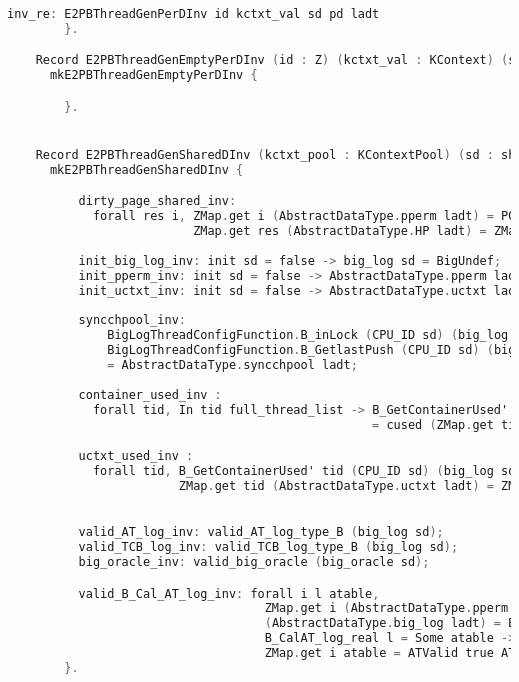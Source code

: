 \begin{lstlisting}[language=C]
          inv_re: E2PBThreadGenPerDInv id kctxt_val sd pd ladt
        }.

    Record E2PBThreadGenEmptyPerDInv (id : Z) (kctxt_val : KContext) (sd : sharedData) (ladt : AbstractDataType.RData) :=
      mkE2PBThreadGenEmptyPerDInv {

        }.


    Record E2PBThreadGenSharedDInv (kctxt_pool : KContextPool) (sd : sharedData) (ladt : AbstractDataType.RData) :=
      mkE2PBThreadGenSharedDInv {

          dirty_page_shared_inv:
            forall res i, ZMap.get i (AbstractDataType.pperm ladt) = PGUndef ->
                          ZMap.get res (AbstractDataType.HP ladt) = ZMap.get res (FlatMem.free_page i (AbstractDataType.HP ladt));
          
          init_big_log_inv: init sd = false -> big_log sd = BigUndef;
          init_pperm_inv: init sd = false -> AbstractDataType.pperm ladt = ZMap.init PGUndef;
          init_uctxt_inv: init sd = false -> AbstractDataType.uctxt ladt = ZMap.init (ZMap.init Vundef);
         
          syncchpool_inv:  
              BigLogThreadConfigFunction.B_inLock (CPU_ID sd) (big_log sd) = false ->
              BigLogThreadConfigFunction.B_GetlastPush (CPU_ID sd) (big_log sd) 
              = AbstractDataType.syncchpool ladt;
          
          container_used_inv :
            forall tid, In tid full_thread_list -> B_GetContainerUsed' tid (CPU_ID sd) (big_log sd) 
                                                   = cused (ZMap.get tid (AbstractDataType.AC ladt));

          uctxt_used_inv :
            forall tid, B_GetContainerUsed' tid (CPU_ID sd) (big_log sd) = false ->
                        ZMap.get tid (AbstractDataType.uctxt ladt) = ZMap.init Vundef;

          
          valid_AT_log_inv: valid_AT_log_type_B (big_log sd); 
          valid_TCB_log_inv: valid_TCB_log_type_B (big_log sd);
          big_oracle_inv: valid_big_oracle (big_oracle sd);

          valid_B_Cal_AT_log_inv: forall i l atable, 
                                    ZMap.get i (AbstractDataType.pperm ladt) <> PGUndef ->
                                    (AbstractDataType.big_log ladt) = BigDef l ->
                                    B_CalAT_log_real l = Some atable ->
                                    ZMap.get i atable = ATValid true ATNorm
        }.


\end{lstlisting}
